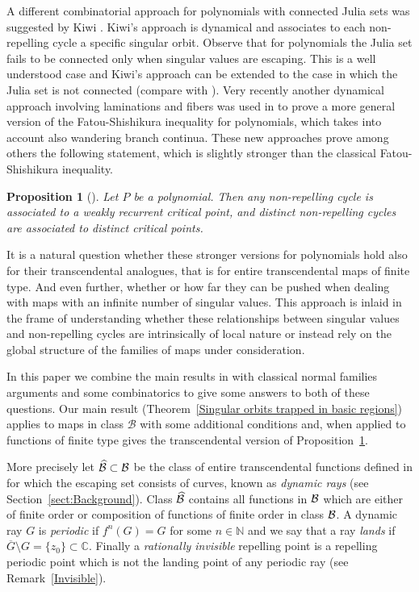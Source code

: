 \documentclass[11pt, twoside]{article}
\newtheorem{prop}[thm]{Proposition}
\theoremstyle{definition}
\newcommand{\C}{\mathbb{C}}
\newcommand{\N}{\mathbb{N}}
\newcommand{\ov}{\overline}
\newcommand{\BB}{{\cal B}}
\newcommand{\BBhat}{\widehat{\BB}}
\begin{document}
A different  combinatorial approach  for polynomials with connected Julia sets was suggested by Kiwi \cite{Ki00}. Kiwi's approach is dynamical and associates to each non-repelling cycle a specific singular orbit. Observe that for polynomials the Julia set fails to be connected only when singular values are escaping. {This is a well understood case and  Kiwi's approach can be extended to the case in which  the Julia set is not connected (compare with \cite{BCLOS16})}. 
Very recently another dynamical approach involving  laminations and fibers was used in \cite{BCLOS16} to prove  a more general version of the Fatou-Shishikura inequality   for polynomials,  which takes into account also wandering branch continua. These new  approaches prove among others the following statement, which is slightly stronger than the classical Fatou-Shishikura inequality.  

\begin{prop}[\cite{BCLOS16}]\label{prop:Strong Shishi Poly} Let $P$ be a polynomial. Then any non-repelling cycle is associated to a weakly recurrent critical point, and distinct non-repelling cycles are associated to distinct  critical points.
\end{prop}
 
 It is a natural question whether these stronger versions for polynomials hold also for their transcendental analogues, that is for entire transcendental maps of finite type. And even further, whether or how far  they can be pushed when dealing with maps with an infinite number of singular values.  This approach is inlaid in the frame of understanding whether these relationships between singular values and non-repelling cycles are intrinsically of local nature or instead rely on the global structure of the families of  maps under consideration.
 
In this paper we combine the main results in \cite{BF15} with  classical normal families arguments and some combinatorics to give some answers to both of these questions.  Our main result (Theorem~\ref{Singular orbits trapped in basic regions}) applies to maps in class $\mathcal{B}$ with some additional conditions and, when applied to functions of finite type gives the transcendental version of Proposition~\ref{prop:Strong Shishi Poly}.

More precisely let $\BBhat \subset \BB$ be the class of entire transcendental functions defined in \cite{RRRS} for which the escaping set consists of curves, known as {\em dynamic rays} (see Section~\ref{sect:Background}). Class $\BBhat$ contains all functions in $\BB$ which are either of finite order or composition of functions of finite order in class $\BB$. A dynamic ray $G$ is \emph{periodic} if $f^n(G)=G$ for some $n\in\N$ and we say that a ray  \emph{lands} if $\ov{G}\setminus G=\{z_0\}\subset\C$. Finally a  \emph{rationally invisible} repelling point is a  repelling periodic point which is not the landing point of any periodic ray (see Remark~\ref{Invisible}).
\end{document}
